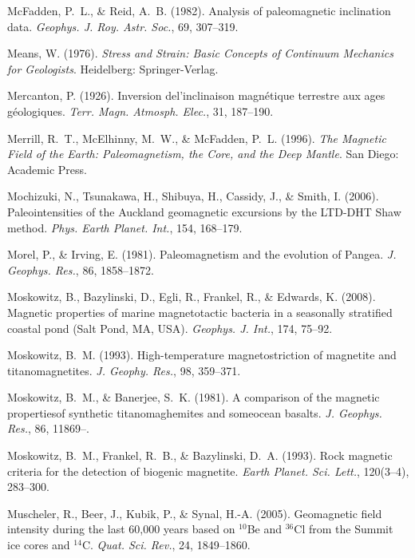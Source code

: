 \documentclass[,plain]{tauxe}
\begin{document}
\begin{thebibliography}{}
\bibitem{}%
McFadden, P.~L., \& Reid, A.~B. (1982).
Analysis of paleomagnetic inclination data.
{\it Geophys. J. Roy. Astr. Soc.}, 69, 307--319.

\bibitem{}%
Means, W. (1976).
{\it Stress and Strain: Basic Concepts of Continuum Mechanics for Geologists}.
Heidelberg:	Springer-Verlag.

\bibitem{}%
Mercanton, P. (1926).
Inversion de\break l'inclinaison magn\'etique terrestre aux ages g\'eologiques.
{\it Terr. Magn. Atmosph. Elec.}, 31, 187--190.

\bibitem{}%
Merrill, R.~T., McElhinny, M.~W., \& McFadden, P.~L. (1996).
{\it The Magnetic Field of the Earth: Paleomagnetism, the Core, and the Deep Mantle}.
San Diego: Academic Press.

\bibitem{}%
Mochizuki, N., Tsunakawa, H., Shibuya, H., Cassidy, J., \& Smith, I. (2006).
Paleointensities of the Auckland geomagnetic excursions by the LTD-DHT Shaw method.
{\it Phys. Earth Planet. Int.}, 154, 168--179.

\bibitem{}%
Morel, P., \& Irving, E. (1981).
Paleomagnetism and the evolution of Pangea.
{\it J. Geophys. Res.}, 86, 1858--1872.

\bibitem{}%
Moskowitz, B., Bazylinski, D., Egli, R., Frankel, R., \& Edwards, K. (2008).
Magnetic properties of marine magnetotactic bacteria in a seasonally stratified coastal pond (Salt Pond, MA, USA).
{\it Geophys. J. Int.}, 174, 75--92.

\bibitem{}%
Moskowitz, B.~M. (1993).
High-temperature magnetostriction of magnetite and titanomagnetites.
{\it J. Geophy. Res.}, 98, 359--371.

\bibitem{}%
Moskowitz, B.~M., \& Banerjee, S.~K. (1981).\break
A comparison of the magnetic properties\break of synthetic titanomaghemites and some\break ocean basalts.
{\it J. Geophys. Res.}, 86, 11869--.

\bibitem{}%
Moskowitz, B.~M., Frankel, R.~B., \& Bazylinski, D.~A. (1993).
Rock magnetic criteria for the detection of biogenic magnetite.
{\it Earth Planet. Sci. Lett.}, 120(3--4), 283--300.

\bibitem{}%
Muscheler, R., Beer, J., Kubik, P., \& Synal, H.-A. (2005).
Geomagnetic field intensity during the last 60,000 years based on $^{10}$Be and $^{36}$Cl from the Summit ice cores and $^{14}$C.
{\it Quat. Sci. Rev.}, 24, 1849--1860.


\end{thebibliography}
\end{document}
